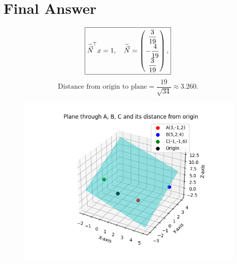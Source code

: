 \documentclass[12pt]{article}
\begin{document}
\section*{Final Answer}
\begin{equation}
\boxed{ \widetilde{\Vec{N}}^{\!\top} x = 1,\quad
\widetilde{\Vec{N}} = \begin{pmatrix}\dfrac{3}{19} \\[4pt] -\dfrac{4}{19} \\[4pt] \dfrac{3}{19}\end{pmatrix}, }
\end{equation}
\begin{equation}
\boxed{ \text{Distance from origin to plane} = \dfrac{19}{\sqrt{34}} \approx 3.260. }
\end{equation}

\begin{figure}[h!]
    \centering
    \includegraphics[width=0.65\linewidth]{figs/fig.png}
    \caption{}
\end{figure}
\end{document}
